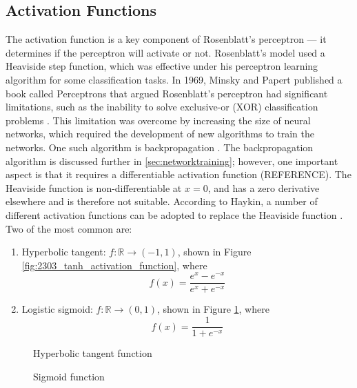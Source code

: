 \subsection{Activation Functions}
The activation function is a key component of Rosenblatt's perceptron --- it determines if the perceptron will activate or not. Rosenblatt's model used a Heaviside step function, which was effective under his perceptron learning algorithm for some classification tasks. In 1969, Minsky and Papert published a book called Perceptrons that argued Rosenblatt's perceptron had significant limitations, such as the inability to solve exclusive-or (XOR) classification problems \cite{Minsky1969}. This limitation was overcome by increasing the size of neural networks, which required the development of new algorithms to train the networks. One such algorithm is backpropagation \cite{Werbos1982}. The backpropagation algorithm is discussed further in \textsection \ref{sec:networktraining}; however, one important aspect is that it requires a differentiable activation function (REFERENCE). The Heaviside function is non-differentiable at $x = 0$, and has a zero derivative elsewhere and is therefore not suitable. According to Haykin, a number of different activation functions can be adopted to replace the Heaviside function \cite{Haykin99}. Two of the most common are:
\begin{enumerate}
	\item Hyperbolic tangent: $f:\mathbb{R} \to (-1,1)$, shown in Figure \ref{fig:2303_tanh_activation_function}, where
	\begin{equation}
		f(x) = \frac{e^x - e^{-x}}{e^x + e^{-x}}
	\end{equation}
	\item Logistic sigmoid: $f:\mathbb{R} \to (0,1)$, shown in Figure \ref{fig:2304_sigmoid_activation_function}, where
	\begin{equation}
		f(x) = \frac{1}{1 + e^{-x}}
	\end{equation}
\end{enumerate}

\begin{figure}[h]
	\centering
	\begin{minipage}[t]{0.45\textwidth}
		\centering
		
		\caption[Hyperbolic tangent activation function]{Hyperbolic tangent function}
		\label{fig:2303_tanh_activation_function}
	\end{minipage}
	\hspace{1cm}
	\begin{minipage}[t]{0.45\textwidth}
		\centering
		
		\caption[Sigmoid activation function]{Sigmoid function}
		\label{fig:2304_sigmoid_activation_function}
	\end{minipage}
\end{figure}

